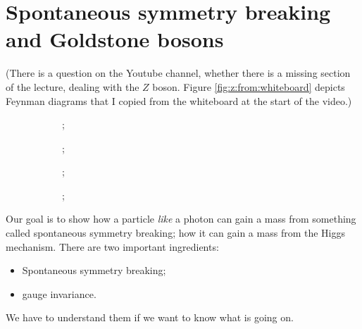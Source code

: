 \documentclass[]{article}
\begin{document}
\section{Spontaneous symmetry breaking and Goldstone bosons}

(There is a question on the Youtube channel, whether there is a missing section of the lecture, dealing with the $Z$ boson. Figure \ref{fig:z:from:whiteboard} depicts Feynman diagrams that I copied from the whiteboard at the start of the video.) 

\begin{figure}[H]
	\caption[Feynman diagrams of Z boson from whiteboard]{Feynman diagrams of Z boson from whiteboard at the start of the video. These are consistent with the decay modes described in Wikipedia: $Z\rightarrow$ fermion plus its antiparticle.}\label{fig:z:from:whiteboard}
	\begin{subfigure}[t]{0.2\textwidth}
		;
	\end{subfigure}
	\hfill
	\begin{subfigure}[t]{0.2\textwidth}
	;
	\end{subfigure}
	\hfill
	\begin{subfigure}[t]{0.2\textwidth}
	;
	\end{subfigure}
	\hfill
	\begin{subfigure}[t]{0.2\textwidth}
	;
	\end{subfigure}
\end{figure}
Our goal is to show how a particle \emph{like} a photon can gain a mass from something called spontaneous symmetry breaking; how it can gain a mass from the Higgs mechanism. There are two important ingredients:

\begin{itemize}
	\item Spontaneous symmetry breaking;
	\item gauge invariance.
\end{itemize}
We have to understand them if we want to know what is going on.
\end{document}
